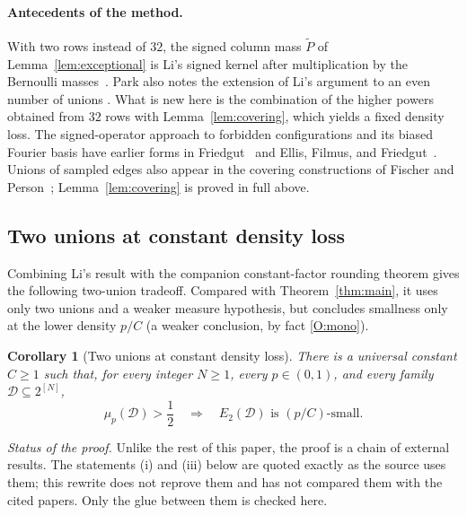 \documentclass[11pt,letterpaper]{article}
\newtheorem{corollary}[theorem]{Corollary}
\theoremstyle{definition}
\theoremstyle{remark}
\numberwithin{equation}{section}
\begin{document}
\paragraph{Antecedents of the method.}
With two rows instead of $32$, the signed column mass $\widetilde P$ of
Lemma~\ref{lem:exceptional} is Li's signed kernel after multiplication by
the Bernoulli masses~\cite[Section~2]{Li26}. Park also notes the
extension of Li's argument to an even number of unions
\cite[Corollary~3.5, footnote~3]{Park26}. What is new here is the
combination of the higher powers obtained from $32$ rows with
Lemma~\ref{lem:covering}, which yields a fixed density loss. The
signed-operator approach to forbidden configurations and its biased
Fourier basis have earlier forms in Friedgut~\cite[Section~2.2]{Friedgut08}
and Ellis, Filmus, and
Friedgut~\cite[Sections~2.2 and~4.1]{EllisFilmusFriedgut12}. Unions of
sampled edges also appear in the covering constructions of Fischer and
Person~\cite[Sections~1.1 and~2]{FischerPerson25};
Lemma~\ref{lem:covering} is proved in full above.

\subsection{Two unions at constant density loss}

Combining Li's result with the companion constant-factor rounding theorem
gives the following two-union tradeoff. Compared with
Theorem~\ref{thm:main}, it uses only two unions and a weaker measure
hypothesis, but concludes smallness only at the lower density $p/C$ (a
weaker conclusion, by fact \ref{O:mono}).

\begin{corollary}[Two unions at constant density loss]
\label{cor:two-union}
There is a universal constant $C\ge1$ such that, for every integer $N\ge1$,
every $p\in(0,1)$, and every family $\mathcal D\subseteq2^{[N]}$,
\[
\mu_p(\mathcal D)>\frac12
\quad\Longrightarrow\quad
E_2(\mathcal D)\text{ is }(p/C)\text{-small}.
\]
\end{corollary}

\emph{Status of the proof.} Unlike the rest of this paper, the proof is a
chain of external results. The statements (i) and (iii) below are quoted
exactly as the source uses them; this rewrite does not reprove them and has
not compared them with the cited papers. Only the glue between them is
checked here.
\end{document}
